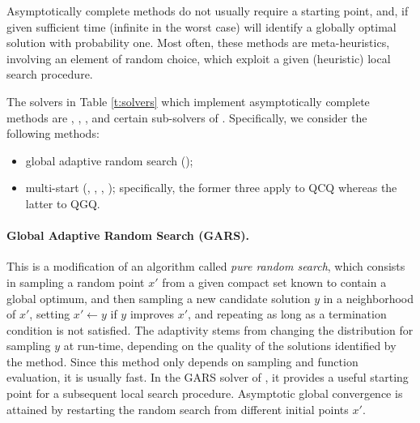 Asymptotically complete methods do not usually require a starting point, and, if given sufficient time (infinite in the worst case) will identify a globally optimal solution with probability one. Most often, these methods are meta-heuristics, involving an element of random choice, which exploit a given (heuristic) local search procedure.

The solvers in Table \ref{t:solvers} which implement asymptotically complete methods are \oqnlp, \msnlp, \knitro, and certain sub-solvers of \lgo. Specifically, we consider the following methods:
%
\begin{itemize}
 \item global adaptive random search (\lgo);
 \item multi-start (\knitro, \lgo, \msnlp, \oqnlp); specifically, the former three apply to QCQ whereas the latter to QGQ.
\end{itemize}

\paragraph{Global Adaptive Random Search (GARS).}
%
This is a modification of an algorithm called \emph{pure random search}, which consists in sampling a random point $x'$ from a given compact set known to contain a global optimum, and then sampling a new candidate solution $y$ in a neighborhood of $x'$, setting $x' \leftarrow y$ if $y$ improves $x'$, and repeating as long as a termination condition is not satisfied. The adaptivity stems from changing the distribution for sampling $y$ at run-time, depending on the quality of the solutions identified by the method. Since this method only depends on sampling and function evaluation, it is usually fast. In the GARS solver of \lgo, it provides a useful starting point for a subsequent local search procedure. Asymptotic global convergence is attained by restarting the random search from different initial points $x'$.

